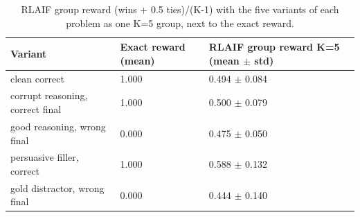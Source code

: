 \begin{table}[t]
\centering
\small
\caption{RLAIF group reward (wins + 0.5 ties)/(K-1) with the five variants of each problem as one K=5 group, next to the exact reward.}
\begin{tabular}{lll}
\toprule
Variant & Exact reward (mean) & RLAIF group reward K=5 (mean $\pm$ std) \\
\midrule
clean correct & 1.000 & 0.494 $\pm$ 0.084 \\
corrupt reasoning, correct final & 1.000 & 0.500 $\pm$ 0.079 \\
good reasoning, wrong final & 0.000 & 0.475 $\pm$ 0.050 \\
persuasive filler, correct & 1.000 & 0.588 $\pm$ 0.132 \\
gold distractor, wrong final & 0.000 & 0.444 $\pm$ 0.140 \\
\bottomrule
\end{tabular}
\end{table}

